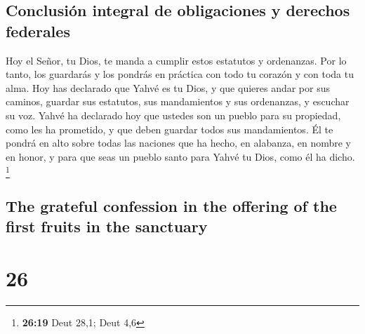 \begin{paracol}{2}
\hypertarget{conclusiuxf3n-integral-de-obligaciones-y-derechos-federales}{%
\subsection{Conclusión integral de obligaciones y derechos
federales}\label{conclusiuxf3n-integral-de-obligaciones-y-derechos-federales}}

 Hoy el Señor, tu Dios, te manda a cumplir estos
estatutos y ordenanzas. Por lo tanto, los guardarás y los pondrás en
práctica con todo tu corazón y con toda tu alma.  Hoy has
declarado que Yahvé es tu Dios, y que quieres andar por sus caminos,
guardar sus estatutos, sus mandamientos y sus ordenanzas, y escuchar su
voz.  Yahvé ha declarado hoy que ustedes son un pueblo
para su propiedad, como les ha prometido, y que deben guardar todos sus
mandamientos.  Él te pondrá en alto sobre todas las
naciones que ha hecho, en alabanza, en nombre y en honor, y para que
seas un pueblo santo para Yahvé tu Dios, como él ha dicho. \footnote{\textbf{26:19}
  Deut 28,1; Deut 4,6}

\switchcolumn
\begin{otherlanguage}{english}

\hypertarget{the-grateful-confession-in-the-offering-of-the-first-fruits-in-the-sanctuary}{%
\subsection{The grateful confession in the offering of the first fruits
in the
sanctuary}\label{the-grateful-confession-in-the-offering-of-the-first-fruits-in-the-sanctuary}}

\hypertarget{section-51}{%
\section{26}\label{section-51}}


\end{otherlanguage}
\end{paracol}
